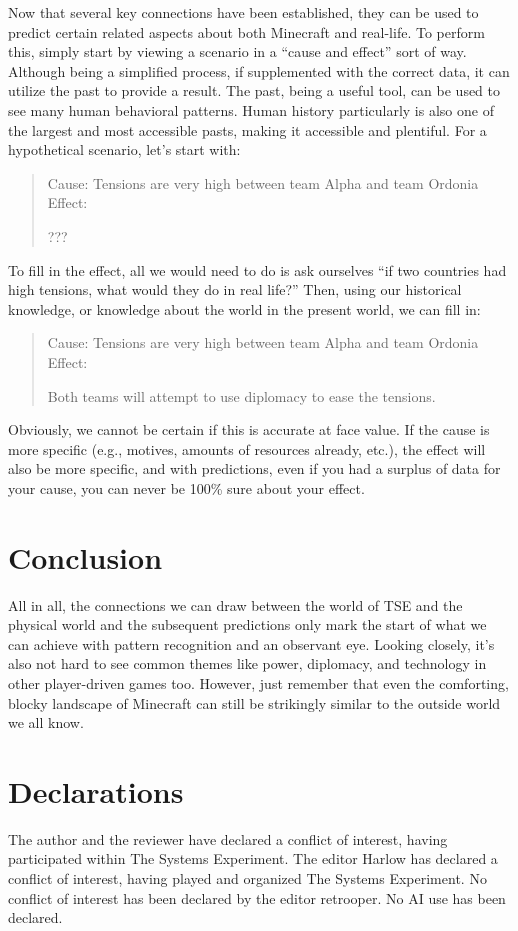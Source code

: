 Now that several key connections have been established, they can be used to predict certain related aspects about both Minecraft and real-life. To perform this, simply start by viewing a scenario in a “cause and effect” sort of way. Although being a simplified process, if supplemented with the correct data, it can utilize the past to provide a result. The past, being a useful tool, can be used to see many human behavioral patterns. Human history particularly is also one of the largest and most accessible pasts, making it accessible and plentiful. For a hypothetical scenario, let's start with:

\begin{verse}
    Cause: Tensions are very high between team Alpha and team Ordonia Effect:

    ???
\end{verse}

To fill in the effect, all we would need to do is ask ourselves “if two countries had high tensions, what would they do in real life?” Then, using our historical knowledge, or knowledge about the world in the present world, we can fill in:

\begin{verse}
    Cause: Tensions are very high between team Alpha and team Ordonia Effect:

    Both teams will attempt to use diplomacy to ease the tensions.
\end{verse}

Obviously, we cannot be certain if this is accurate at face value. If the cause is more specific (e.g., motives, amounts of resources already, etc.), the effect will also be more specific, and with predictions, even if you had a surplus of data for your cause, you can never be 100\% sure about your effect.

\section{Conclusion}
All in all, the connections we can draw between the world of TSE and the physical world and the subsequent predictions only mark the start of what we can achieve with pattern recognition and an observant eye. Looking closely, it’s also not hard to see common themes like power, diplomacy, and technology in other player-driven games too. However, just remember that even the comforting, blocky landscape of Minecraft can still be strikingly similar to the outside world we all know.

\section{Declarations}
The author and the reviewer have declared a conflict of interest, having participated within The Systems Experiment. The editor Harlow has declared a conflict of interest, having played and organized The Systems Experiment. No conflict of interest has been declared by the editor retrooper. No AI use has been declared.

